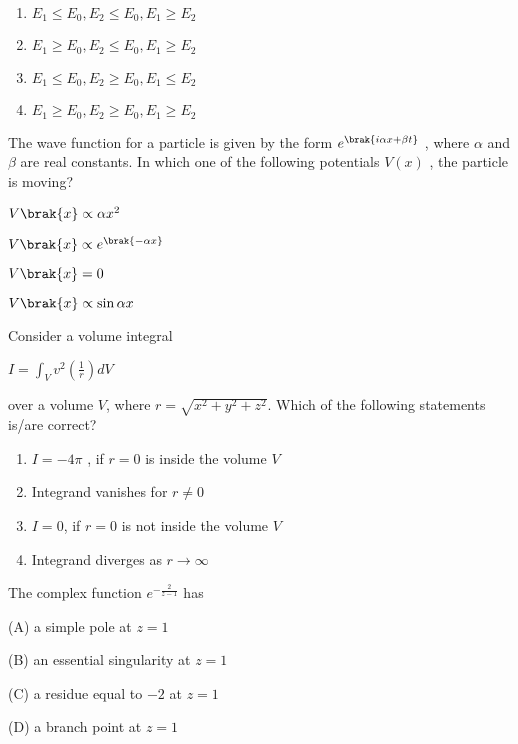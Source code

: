 \begin{enumerate}
\item $E_1 \leq E_0 , E_2 \leq E_0 , E_1 \geq E_2$ 
\item $E_1 \geq E_0 , E_2 \leq E_0 , E_1 \geq E_2$ 
\item $E_1 \leq E_0 , E_2 \geq E_0 , E_1 \leq E_2 $
\item $E_1 \geq E_0 , E_2 \geq E_0 , E_1 \geq E_2 $
\end{enumerate} 
\newpage
\item The wave function for a particle is given by the form  $e^{\brak{i \alpha x + \beta t}}$ , where  $\alpha$  and  $\beta$ are real constants. In which one of the following potentials $V(x)$ , the particle is moving?
\begin{enumerate}
\begin{multicols}{2}
\item $V\brak{x} \propto \alpha x^2 $
\item $V\brak{x} \propto e^{\brak{-\alpha x}} $
\item $V\brak{x} = 0 $
\item $V\brak{x} \propto \sin\alpha x$ 
\end{multicols}
\end{enumerate}
\item  Consider a volume integral
\begin{center}
$I = \int_V v^2 \left( \frac{1}{r} \right) dV$
\end{center}
over a volume $V$, where $r = \sqrt{x^2 + y^2 + z^2}$. Which of the following statements is/are correct?
\begin{enumerate}
\item $I = -4\pi$ , if $r = 0$ is inside the volume $V$ 
\item Integrand vanishes for $r \neq 0$ 
\item $I = 0$, if $r = 0$ is not inside the volume $V$ 
\item Integrand diverges as $r \to \infty$ 
\end{enumerate}
\item The complex function $e^{-\frac{2}{z - 1}}$ has
\begin{enumerate}
\begin{multicols}{2}
    \item[(A)] a simple pole at \( z = 1 \)
    \item[(B)] an essential singularity at \( z = 1 \)
    \item[(C)] a residue equal to \( -2 \) at \( z = 1 \)
    \item[(D)] a branch point at \( z = 1 \)
\end{multicols} 
\end{enumerate}
